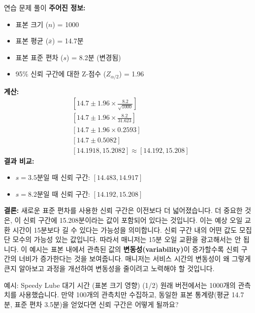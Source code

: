 \documentclass[11pt,a4paper]{article}
\begin{document}
\begin{examplebox}{연습 문제 풀이}
\textbf{주어진 정보:}
\begin{itemize}
    \item 표본 크기 ($n$) = 1000
    \item 표본 평균 ($\bar{x}$) = 14.7분
    \item 표본 표준 편차 ($s$) = 8.2분 (변경됨)
    \item 95\% 신뢰 구간에 대한 Z-점수 ($Z_{\alpha/2}$) = 1.96
\end{itemize}
\textbf{계산:}
\begin{align*}
    & [14.7 \pm 1.96 \times \frac{8.2}{\sqrt{1000}}] \\
    & [14.7 \pm 1.96 \times \frac{8.2}{31.623}] \\
    & [14.7 \pm 1.96 \times 0.2593] \\
    & [14.7 \pm 0.5082] \\
    & [14.1918, 15.2082] \approx [14.192, 15.208]
\end{align*}
\textbf{결과 비교:}
\begin{itemize}
    \item $s = 3.5$분일 때 신뢰 구간: $[14.483, 14.917]$
    \item $s = 8.2$분일 때 신뢰 구간: $[14.192, 15.208]$
\end{itemize}
\textbf{결론:}
새로운 표준 편차를 사용한 신뢰 구간은 이전보다 더 넓어졌습니다. 더 중요한 것은, 이 신뢰 구간에 15.208분이라는 값이 포함되어 있다는 것입니다. 이는 예상 오일 교환 시간이 15분보다 길 수 있다는 가능성을 의미합니다. 신뢰 구간 내의 어떤 값도 모집단 모수의 가능성 있는 값입니다. 따라서 매니저는 15분 오일 교환을 광고해서는 안 됩니다.
이 예시는 표본 내에서 관측된 값의 \textbf{변동성(variability)}이 증가할수록 신뢰 구간의 너비가 증가한다는 것을 보여줍니다. 매니저는 서비스 시간의 변동성이 왜 그렇게 큰지 알아보고 과정을 개선하여 변동성을 줄이려고 노력해야 할 것입니다.
\end{examplebox}

\begin{examplebox}{예시: Speedy Lube 대기 시간 (표본 크기 영향) (1/2)}
원래 버전에서는 1000개의 관측치를 사용했습니다.
만약 100개의 관측치만 수집하고, 동일한 표본 통계량(평균 14.7분, 표준 편차 3.5분)을 얻었다면 신뢰 구간은 어떻게 될까요?
\end{examplebox}
\end{document}
